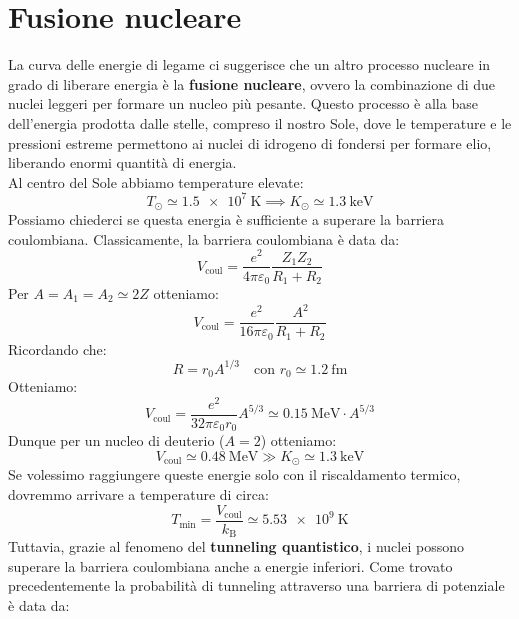 \section{Fusione nucleare}
La curva delle energie di legame ci suggerisce che un altro processo nucleare in grado di liberare energia è la \textbf{fusione nucleare}, ovvero la combinazione di due nuclei leggeri per formare un nucleo più pesante. Questo processo è alla base dell'energia prodotta dalle stelle, compreso il nostro Sole, dove le temperature e le pressioni estreme permettono ai nuclei di idrogeno di fondersi per formare elio, liberando enormi quantità di energia.\\
Al centro del Sole abbiamo temperature elevate:
\begin{equation}
    T_{\odot} \simeq \qty{1.5e7}{\kelvin} \implies K_{\odot} \simeq \qty{1.3}{\kilo\electronvolt}
\end{equation}
Possiamo chiederci se questa energia è sufficiente a superare la barriera coulombiana. Classicamente, la barriera coulombiana è data da:
\begin{equation}
    V_{\text{coul}} = \dfrac{e^2}{4 \pi \varepsilon_0} \dfrac{Z_1Z_2}{R_1 + R_2}
\end{equation}
Per $A = A_1 = A_2 \simeq 2Z$ otteniamo:
\begin{equation}
    V_{\text{coul}} = \dfrac{e^2}{16 \pi \varepsilon_0} \dfrac{A^2}{R_1 + R_2}
\end{equation}
Ricordando che:
\begin{equation}
    R = r_0 A^{1/3} \quad \text{con } r_0 \simeq \qty{1.2}{\femto\meter}
\end{equation}
Otteniamo:
\begin{equation}
    V_{\text{coul}} = \dfrac{e^2}{32 \pi \varepsilon_0 r_0} A^{5/3} \simeq \qty{0.15}{\mega\electronvolt} \cdot A^{5/3}
\end{equation}
Dunque per un nucleo di deuterio ($A=2$) otteniamo:
\begin{equation}
    V_{\text{coul}} \simeq \qty{0.48}{\mega\electronvolt} \gg K_{\odot} \simeq \qty{1.3}{\kilo\electronvolt}
\end{equation}
Se volessimo raggiungere queste energie solo con il riscaldamento termico, dovremmo arrivare a temperature di circa:
\begin{equation}
    T_{\text{min}} = \dfrac{V_{\text{coul}}}{k_{\text{B}}} \simeq \qty{5.53e9}{\kelvin}
\end{equation}
Tuttavia, grazie al fenomeno del \textbf{tunneling quantistico}, i nuclei possono superare la barriera coulombiana anche a energie inferiori. Come trovato precedentemente la probabilità di tunneling attraverso una barriera di potenziale è data da:
